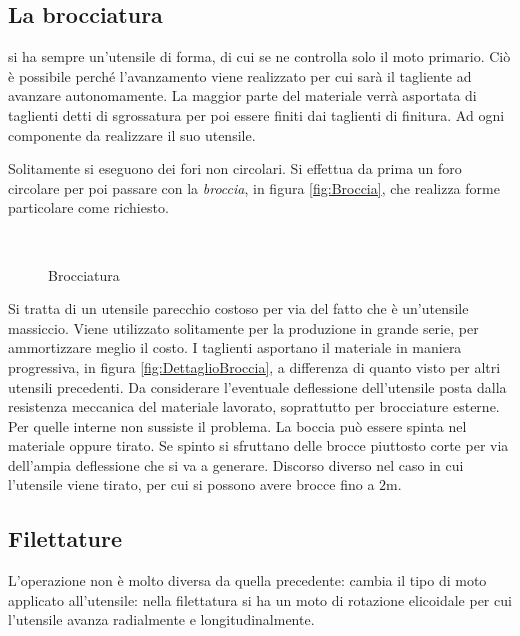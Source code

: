 \subsection{La brocciatura}
si ha sempre un'utensile di forma, di cui se ne controlla solo il moto primario. Ciò è possibile perché l'avanzamento viene realizzato per cui
sarà il tagliente ad avanzare autonomamente.
La maggior parte del materiale verrà asportata di taglienti detti di sgrossatura per poi essere finiti dai taglienti di finitura.
Ad ogni componente da realizzare il suo utensile.

Solitamente si eseguono dei fori non circolari. Si effettua da prima 
un foro circolare per poi passare con la \textit{broccia}, in figura \ref{fig:Broccia}, che realizza forme particolare come richiesto.

\begin{figure}
\centering
{}\\
\caption{Brocciatura}
\label{fig:Brocciatura}
\end{figure}

Si tratta di un utensile parecchio costoso per via del fatto che è un'utensile massiccio. Viene utilizzato solitamente per la produzione in grande serie, per ammortizzare meglio il costo.
I taglienti asportano il materiale in maniera progressiva, in figura \ref{fig:DettaglioBroccia}, a differenza di quanto visto per altri utensili precedenti.
Da considerare l'eventuale deflessione dell'utensile posta dalla resistenza
meccanica del materiale lavorato, soprattutto per brocciature esterne.
Per quelle interne non sussiste il problema.
La boccia può essere spinta nel materiale oppure tirato.
Se spinto si sfruttano delle brocce piuttosto corte per via dell'ampia
deflessione che si va a generare.
Discorso diverso nel caso in cui l'utensile viene tirato, per cui si possono avere brocce fino a $2\unit{\m}$.

\subsection{Filettature}
L'operazione non è molto diversa da quella precedente: cambia il tipo di moto applicato all'utensile: nella filettatura si ha un moto di rotazione
elicoidale per cui l'utensile avanza radialmente e longitudinalmente.

